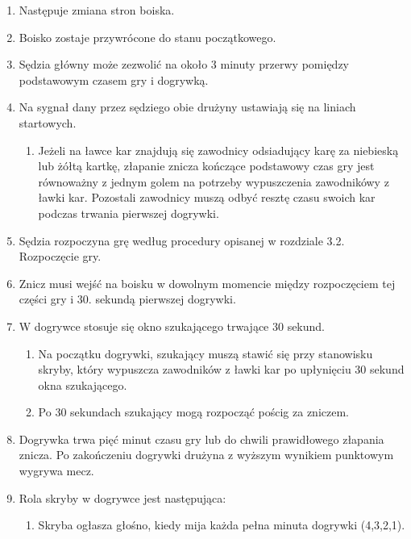 \documentclass[12pt]{article}
\begin{document}
\begin{enumerate}
\item Następuje zmiana stron boiska.

\item Boisko zostaje przywrócone do stanu początkowego.

\item Sędzia główny może zezwolić na około 3 minuty przerwy pomiędzy
podstawowym czasem gry i dogrywką.

\item Na sygnał dany przez sędziego obie drużyny ustawiają się na liniach
startowych.
\begin{enumerate}
\item Jeżeli na ławce kar znajdują się zawodnicy odsiadujący karę za
niebieską lub żółtą kartkę, złapanie znicza kończące podstawowy czas gry
jest równoważny z jednym golem na potrzeby wypuszczenia zawodnikówy z
ławki kar. Pozostali zawodnicy muszą odbyć resztę czasu swoich kar
podczas trwania pierwszej dogrywki.
\end{enumerate}

\item Sędzia rozpoczyna grę według procedury opisanej w rozdziale 3.2.
Rozpoczęcie gry.

\item Znicz musi wejść na boisku w dowolnym momencie między rozpoczęciem
tej części gry i 30. sekundą pierwszej dogrywki.

\item W dogrywce stosuje się okno szukającego trwające 30 sekund.
\begin{enumerate}
\item Na początku dogrywki, szukający muszą stawić się przy stanowisku
skryby, który wypuszcza zawodników z ławki kar po upłynięciu 30 sekund
okna szukającego.

\item Po 30 sekundach szukający mogą rozpocząć pościg za zniczem.
\end{enumerate}

\item Dogrywka trwa pięć minut czasu gry lub do chwili prawidłowego
złapania znicza. Po zakończeniu dogrywki drużyna z wyższym wynikiem
punktowym wygrywa mecz.

\item Rola skryby w dogrywce jest następująca:
\begin{enumerate}
\item  Skryba ogłasza głośno, kiedy mija każda pełna minuta dogrywki
(4,3,2,1).


\end{enumerate}
\end{enumerate}
\end{document}
